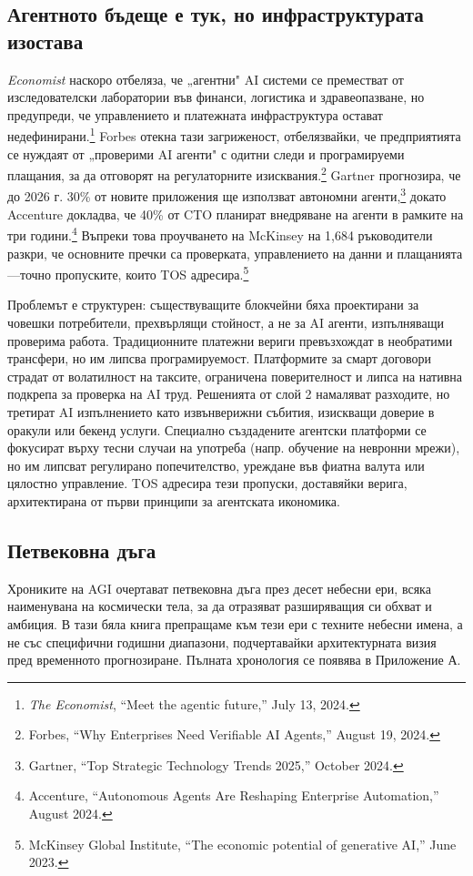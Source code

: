 \documentclass[11pt]{article}
\begin{document}
\subsection{Агентното бъдеще е тук, но инфраструктурата изостава}
\emph{Economist} наскоро отбеляза, че „агентни" AI системи се преместват от изследователски лаборатории във финанси, логистика и здравеопазване, но предупреди, че управлението и платежната инфраструктура остават недефинирани.\footnote{\emph{The Economist}, ``Meet the agentic future,'' July 13, 2024.} Forbes отекна тази загриженост, отбелязвайки, че предприятията се нуждаят от „проверими AI агенти" с одитни следи и програмируеми плащания, за да отговорят на регулаторните изисквания.\footnote{Forbes, ``Why Enterprises Need Verifiable AI Agents,'' August 19, 2024.} Gartner прогнозира, че до 2026 г. 30\% от новите приложения ще използват автономни агенти,\footnote{Gartner, ``Top Strategic Technology Trends 2025,'' October 2024.} докато Accenture докладва, че 40\% от CTO планират внедряване на агенти в рамките на три години.\footnote{Accenture, ``Autonomous Agents Are Reshaping Enterprise Automation,'' August 2024.} Въпреки това проучването на McKinsey на 1,684 ръководители разкри, че основните пречки са проверката, управлението на данни и плащанията---точно пропуските, които TOS адресира.\footnote{McKinsey Global Institute, ``The economic potential of generative AI,'' June 2023.}

Проблемът е структурен: съществуващите блокчейни бяха проектирани за човешки потребители, прехвърлящи стойност, а не за AI агенти, изпълняващи проверима работа. Традиционните платежни вериги превъзхождат в необратими трансфери, но им липсва програмируемост. Платформите за смарт договори страдат от волатилност на таксите, ограничена поверителност и липса на нативна подкрепа за проверка на AI труд. Решенията от слой 2 намаляват разходите, но третират AI изпълнението като извънверижни събития, изискващи доверие в оракули или бекенд услуги. Специално създадените агентски платформи се фокусират върху тесни случаи на употреба (напр. обучение на невронни мрежи), но им липсват регулирано попечителство, уреждане във фиатна валута или цялостно управление. TOS адресира тези пропуски, доставяйки верига, архитектирана от първи принципи за агентската икономика.

\subsection{Петвековна дъга}
Хрониките на AGI очертават петвековна дъга през десет небесни ери, всяка наименувана на космически тела, за да отразяват разширяващия си обхват и амбиция. В тази бяла книга препращаме към тези ери с техните небесни имена, а не със специфични годишни диапазони, подчертавайки архитектурната визия пред временното прогнозиране. Пълната хронология се появява в Приложение А.
\end{document}
